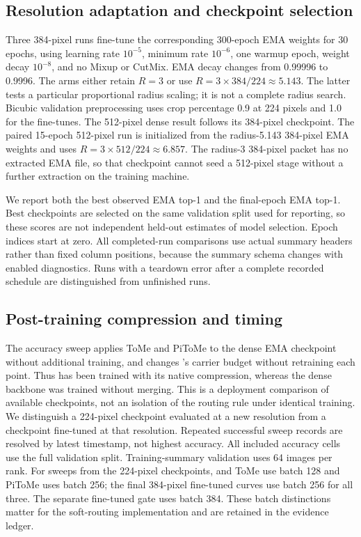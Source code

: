 \subsection{Resolution adaptation and checkpoint selection}

Three 384-pixel runs fine-tune the corresponding 300-epoch EMA weights for
30 epochs, using learning rate $10^{-5}$, minimum rate $10^{-6}$, one warmup
epoch, weight decay $10^{-8}$, and no Mixup or CutMix. EMA decay changes from
0.99996 to 0.9996. The \mn{} arms either retain $R=3$ or use
$R=3\times384/224\approx5.143$. The latter tests a particular proportional
radius scaling; it is not a complete radius search. Bicubic validation
preprocessing uses crop percentage 0.9 at 224 pixels and 1.0 for the
fine-tunes. The 512-pixel dense result follows its 384-pixel checkpoint.
The paired 15-epoch \mn{} 512-pixel run is initialized from the radius-5.143
384-pixel EMA weights and uses $R=3\times512/224\approx6.857$. The
radius-3 384-pixel packet has no extracted EMA file, so that checkpoint
cannot seed a 512-pixel stage without a further extraction on the training
machine.

We report both the best observed EMA top-1 and the final-epoch EMA top-1.
Best checkpoints are selected on the same validation split used for
reporting, so these scores are not independent held-out estimates of model
selection. Epoch indices start at zero. All completed-run comparisons use
actual summary headers rather than fixed column positions, because the
summary schema changes with enabled diagnostics. Runs with a teardown error
after a complete recorded schedule are distinguished from unfinished runs.

\subsection{Post-training compression and timing}

The accuracy sweep applies ToMe and PiToMe to the dense EMA checkpoint
without additional training, and changes \mn{}'s carrier budget without
retraining each point. Thus \mn{} has been trained with its native
compression, whereas the dense backbone was trained without merging. This
is a deployment comparison of available checkpoints, not an isolation of the
routing rule under identical training. We distinguish a 224-pixel checkpoint
evaluated at a new resolution from a checkpoint fine-tuned at that resolution.
Repeated successful sweep records are resolved by latest timestamp, not
highest accuracy. All included accuracy cells use the full validation split. Training-summary
validation uses 64 images per rank. For sweeps from the 224-pixel checkpoints,
\mn{} and ToMe use batch 128 and PiToMe uses batch 256; the final 384-pixel
fine-tuned curves use batch 256 for all three. The separate fine-tuned gate
uses batch 384. These batch distinctions matter for the soft-routing
implementation and are retained in the evidence ledger.

